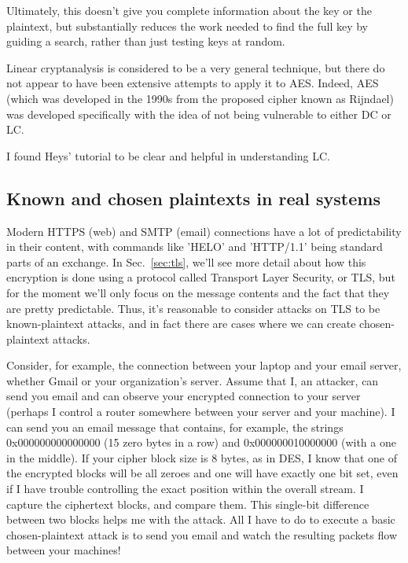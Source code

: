 Ultimately, this doesn't give you complete information about the key
or the plaintext, but substantially reduces the work needed to find
the full key by guiding a search, rather than just testing keys at
random.

\aono{} Linear cryptanalysis is considered to be a very general
technique, but there do not appear to have been extensive attempts to
apply it to AES.  Indeed, AES (which was developed in the 1990s from
the proposed cipher known as Rijndael) was developed specifically with
the idea of not being vulnerable to either DC or LC.

I found Heys' tutorial to be clear and helpful in understanding LC.

\subsection{Known and chosen plaintexts in real systems}



Modern HTTPS (web) and SMTP (email) connections have a lot of
predictability in their content, with commands like 'HELO' and
'HTTP/1.1' being standard parts of an exchange.  In
Sec.~\ref{sec:tls}, we'll see more detail about how this encryption is
done using a protocol called Transport Layer Security, or TLS, but for
the moment we'll only focus on the message contents and the fact that
they are pretty predictable.  Thus, it's reasonable to consider
attacks on TLS to be known-plaintext attacks, and in fact there are
cases where we can create chosen-plaintext attacks.

Consider, for example, the connection between your laptop and your
email server, whether Gmail or your organization's server.  Assume
that I, an attacker, can send you email and can observe your encrypted
connection to your server (perhaps I control a router somewhere
between your server and your machine).  I can send you an email
message that contains, for example, the strings 0x000000000000000 (15
zero bytes in a row) and 0x000000010000000 (with a one in the middle).
If your cipher block size is 8 bytes, as in DES, I know that one of
the encrypted blocks will be all zeroes and one will have exactly one
bit set, even if I have trouble controlling the exact position within
the overall stream.  I capture the ciphertext blocks, and compare
them.  This single-bit difference between two blocks helps me with the
attack.  All I have to do to execute a basic chosen-plaintext attack
is to send you email and watch the resulting packets flow between your
machines!


